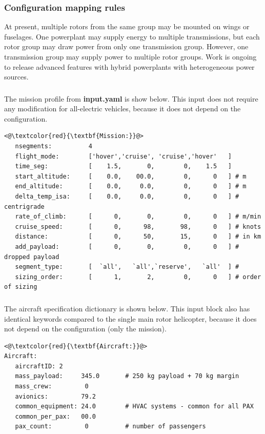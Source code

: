 \subsubsection*{Configuration mapping rules}
At present, multiple rotors from the same group may be mounted on wings or fuselages. One powerplant may supply energy to multiple transmissions, but  each rotor group may draw power from only one transmission group. However, one transmission group may supply power to multiple rotor groups. Work is ongoing to release advanced features with hybrid powerplants with heterogeneous power sources. 

\subsubsection{}
The mission profile from \textbf{input.yaml} is show below. This input does not require any modification for all-electric vehicles, because it does not depend on the configuration.
\begin{lstlisting}
<@\textcolor{red}{\textbf{Mission:}}@>
   nsegments:          4
   flight_mode:        ['hover','cruise', 'cruise','hover'   ]
   time_seg:           [    1.5,       0,        0,    1.5   ]
   start_altitude:     [    0.0,    00.0,        0,      0   ] # m
   end_altitude:       [    0.0,     0.0,        0,      0   ] # m
   delta_temp_isa:     [    0.0,     0.0,        0,      0   ] # centrigrade
   rate_of_climb:      [      0,       0,        0,      0   ] # m/min
   cruise_speed:       [      0,      98,       98,      0   ] # knots
   distance:           [      0,      50,       15,      0   ] # in km
   add_payload:        [      0,       0,        0,      0   ] # dropped payload 
   segment_type:       [  `all',   `all',`reserve',   `all'  ] # 
   sizing_order:       [      1,       2,        0,      0   ] # order of sizing
\end{lstlisting}

\pagebreak
\subsubsection{}

The aircraft specification dictionary is shown below. This input block also has identical keywords compared to the single main rotor helicopter, because it does not depend on the configuration (only the mission).

\begin{lstlisting}
<@\textcolor{red}{\textbf{Aircraft:}}@>
Aircraft:
   aircraftID: 2
   mass_payload:     345.0       # 250 kg payload + 70 kg margin
   mass_crew:         0 
   avionics:         79.2
   common_equipment: 24.0        # HVAC systems - common for all PAX
   common_per_pax:   00.0
   pax_count:         0          # number of passengers 
\end{lstlisting}

